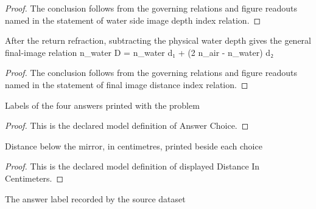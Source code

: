 \begin{proof}
  The conclusion follows from the governing relations and figure readouts named in the statement of water side image depth index relation.
\end{proof}
\begin{lemma}
  \label{lem:physics:phyx-mini-0161:phyxminiproblems-problemphyxmini0161-final-image-distance-index-relation}
  After the return refraction, subtracting the physical water depth gives the general final-image relation n\_water D = n\_water d₁ + (2 n\_air - n\_water) d₂
\end{lemma}
\begin{proof}
  The conclusion follows from the governing relations and figure readouts named in the statement of final image distance index relation.
\end{proof}
\begin{definition}
  \label{def:physics:phyx-mini-0161:phyxminiproblems-problemphyxmini0161-answerchoice}
  Labels of the four answers printed with the problem
\end{definition}
\begin{proof}
  This is the declared model definition of Answer Choice.
\end{proof}
\begin{definition}
  \label{def:physics:phyx-mini-0161:phyxminiproblems-problemphyxmini0161-displayeddistanceincentimeters}
  Distance below the mirror, in centimetres, printed beside each choice
\end{definition}
\begin{proof}
  This is the declared model definition of displayed Distance In Centimeters.
\end{proof}
\begin{definition}
  \label{def:physics:phyx-mini-0161:phyxminiproblems-problemphyxmini0161-recordeddatasetanswer}
  The answer label recorded by the source dataset
\end{definition}
